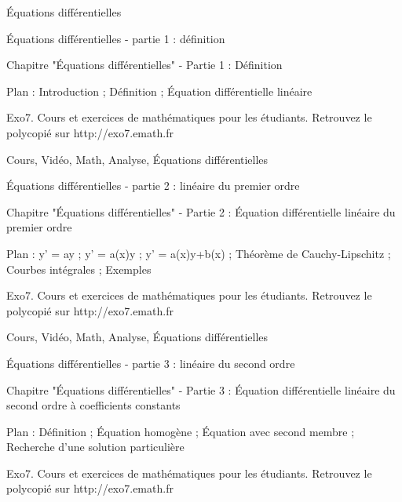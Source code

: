 
   Équations différentielles




Équations différentielles - partie 1 : définition



Chapitre "Équations différentielles" - Partie 1 : Définition

Plan : Introduction ; Définition ; Équation différentielle linéaire

Exo7. Cours et exercices de mathématiques pour les étudiants.
Retrouvez le polycopié sur http://exo7.emath.fr


Cours, Vidéo, Math, Analyse, Équations différentielles



Équations différentielles - partie 2 : linéaire du premier ordre



Chapitre "Équations différentielles" - Partie 2 : Équation différentielle linéaire du premier ordre

Plan : y' = ay ; y' = a(x)y ; y' = a(x)y+b(x) ; Théorème de Cauchy-Lipschitz ;
Courbes intégrales ; Exemples

Exo7. Cours et exercices de mathématiques pour les étudiants.
Retrouvez le polycopié sur http://exo7.emath.fr


Cours, Vidéo, Math, Analyse, Équations différentielles



Équations différentielles - partie 3 : linéaire du second ordre



Chapitre "Équations différentielles" - Partie 3 : Équation différentielle linéaire du second ordre à coefficients constants

Plan : Définition ; Équation homogène ; Équation avec second membre ;
Recherche d'une solution particulière

Exo7. Cours et exercices de mathématiques pour les étudiants.
Retrouvez le polycopié sur http://exo7.emath.fr

